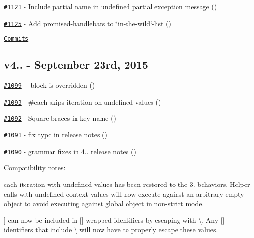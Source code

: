\begin{DoxyItemize}
\item \href{https://github.com/wycats/handlebars.js/pull/1121}{\tt \#1121} -\/ Include partial name in \textquotesingle{}undefined partial\textquotesingle{} exception message (\href{https://api.github.com/users/shinypb}{\tt })
\item \href{https://github.com/wycats/handlebars.js/pull/1125}{\tt \#1125} -\/ Add promised-\/handlebars to \char`\"{}in-\/the-\/wild\char`\"{}-\/list (\href{https://api.github.com/users/nknapp}{\tt })
\end{DoxyItemize}

\href{https://github.com/wycats/handlebars.js/compare/v4.0.3...v4.0.4}{\tt Commits}

\subsection*{v4.. -\/ September 23rd, 2015}


\begin{DoxyItemize}
\item \href{https://github.com/wycats/handlebars.js/issues/1099}{\tt \#1099} -\/ -\/block is overridden (\href{https://api.github.com/users/btmorex}{\tt })
\item \href{https://github.com/wycats/handlebars.js/issues/1093}{\tt \#1093} -\/ \#each skips iteration on undefined values (\href{https://api.github.com/users/florianpilz}{\tt })
\item \href{https://github.com/wycats/handlebars.js/issues/1092}{\tt \#1092} -\/ Square braces in key name (\href{https://api.github.com/users/distantnative}{\tt })
\item \href{https://github.com/wycats/handlebars.js/pull/1091}{\tt \#1091} -\/ fix typo in release notes (\href{https://api.github.com/users/nikolas}{\tt })
\item \href{https://github.com/wycats/handlebars.js/pull/1090}{\tt \#1090} -\/ grammar fixes in 4.. release notes (\href{https://api.github.com/users/nikolas}{\tt })
\end{DoxyItemize}

Compatibility notes\+:
\begin{DoxyItemize}
\item {\ttfamily each} iteration with {\ttfamily undefined} values has been restored to the 3. behaviors. Helper calls with undefined context values will now execute against an arbitrary empty object to avoid executing against global object in non-\/strict mode.
\item {\ttfamily \mbox{]}} can now be included in {\ttfamily \mbox{[}\mbox{]}} wrapped identifiers by escaping with {\ttfamily \textbackslash{}}. Any {\ttfamily \mbox{[}\mbox{]}} identifiers that include {\ttfamily \textbackslash{}} will now have to properly escape these values.
\end{DoxyItemize}

